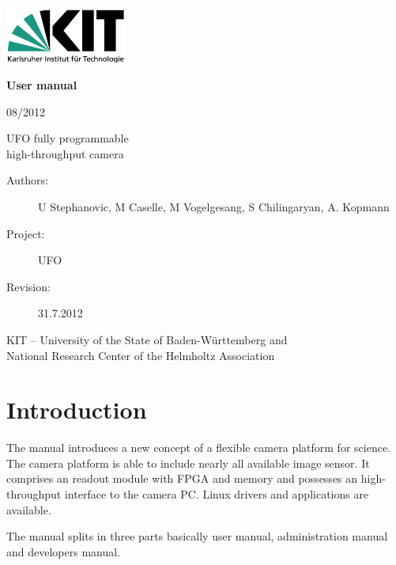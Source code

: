 \documentclass[12pt,a4paper,twoside]{book}
\begin{document}
\begin{titlepage}
\includegraphics[width=4cm]{images/kit_logo.png}


\hspace{4cm}
\begin{minipage}{12cm}
\vspace{3cm}
{\LARGE\bf User manual}

\vspace{0.2cm}
08/2012

\vspace{2.5cm}
{\LARGE UFO fully programmable\\[0.7ex]
 high-throughput camera}

\end{minipage}

\vfill
\hspace{4cm}
\begin{minipage}{12cm}
\begin{description}
\item[\textnormal{Authors:}] U Stephanovic, M Caselle, M Vogelgesang, S Chilingaryan, A. Kopmann
\item[\textnormal{Project:}] UFO 
\item[\textnormal{Revision:}] 31.7.2012 
\end{description}

\vspace{3cm}
KIT -- University of the State of Baden-Württemberg and\\
National Research Center of the Helmholtz Association
\end{minipage}
\end{titlepage}

\tableofcontents


\chapter*{Introduction}


The manual introduces a new concept of a flexible camera platform for science. The camera platform is able
to include nearly all available image sensor. It comprises an readout module with FPGA and memory and 
possesses an high-throughput interface to the camera PC. Linux drivers and applications are available.

The manual splits in three parts basically user manual, administration manual and developers manual.
\end{document}
